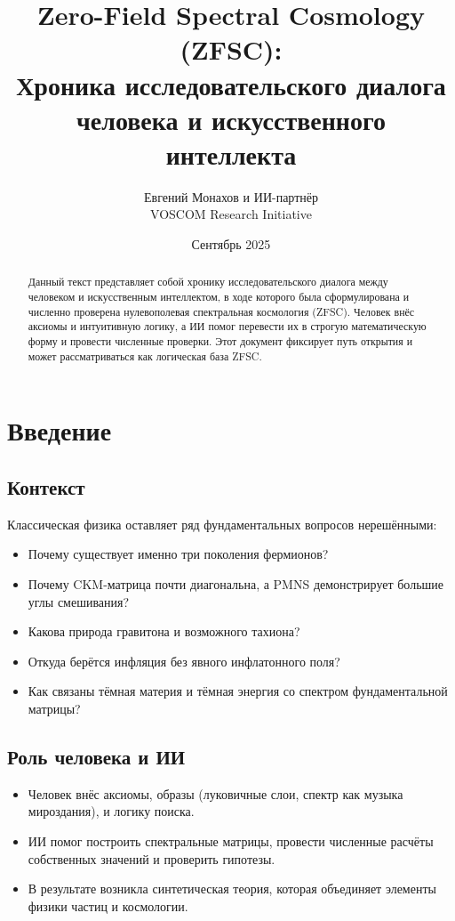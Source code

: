 \documentclass[12pt,a4paper]{article}
\title{Zero-Field Spectral Cosmology (ZFSC): \\
Хроника исследовательского диалога человека и искусственного интеллекта}
\author{Евгений Монахов и ИИ-партнёр \\ VOSCOM Research Initiative}
\date{Сентябрь 2025}
\begin{document}
\maketitle

\begin{abstract}
Данный текст представляет собой хронику исследовательского диалога между человеком и искусственным интеллектом, 
в ходе которого была сформулирована и численно проверена нулевополевая спектральная космология (ZFSC).
Человек внёс аксиомы и интуитивную логику, а ИИ помог перевести их в строгую математическую форму и провести численные проверки.
Этот документ фиксирует путь открытия и может рассматриваться как логическая база ZFSC.
\end{abstract}

\section{Введение}
\subsection{Контекст}
Классическая физика оставляет ряд фундаментальных вопросов нерешёнными:
\begin{itemize}
  \item Почему существует именно три поколения фермионов?
  \item Почему CKM-матрица почти диагональна, а PMNS демонстрирует большие углы смешивания?
  \item Какова природа гравитона и возможного тахиона?
  \item Откуда берётся инфляция без явного инфлатонного поля?
  \item Как связаны тёмная материя и тёмная энергия со спектром фундаментальной матрицы?
\end{itemize}

\subsection{Роль человека и ИИ}
\begin{itemize}
  \item Человек внёс аксиомы, образы (луковичные слои, спектр как музыка мироздания), и логику поиска.
  \item ИИ помог построить спектральные матрицы, провести численные расчёты собственных значений и проверить гипотезы.
  \item В результате возникла синтетическая теория, которая объединяет элементы физики частиц и космологии.
\end{itemize}
\end{document}
